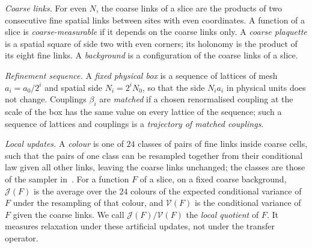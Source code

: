 \emph{Coarse links.} For even $N$, the coarse links of a slice are the products of two consecutive fine
spatial links between sites with even coordinates. A function of a slice is \emph{coarse-measurable} if it
depends on the coarse links only. A \emph{coarse plaquette} is a spatial square of side two with even corners;
its holonomy is the product of its eight fine links. A \emph{background} is a configuration of the coarse
links of a slice.

\emph{Refinement sequence.} A \emph{fixed physical box} is a sequence of lattices of mesh $a_i=a_0/2^i$ and
spatial side $N_i=2^iN_0$, so that the side $N_ia_i$ in physical units does not change. Couplings $\beta_i$ are
\emph{matched} if a chosen renormalised coupling at the scale of the box has the same value on every lattice
of the sequence; such a sequence of lattices and couplings is a \emph{trajectory of matched couplings}.

\emph{Local updates.} A \emph{colour} is one of $24$ classes of pairs of fine links inside coarse cells, such
that the pairs of one class can be resampled together from their conditional law given all other links,
leaving the coarse links unchanged; the classes are those of the sampler in~\cite{RepoData}. For a function
$F$ of a slice, on a fixed coarse background, $\mathcal J(F)$ is the average over the $24$ colours of the
expected conditional variance of $F$ under the resampling of that colour, and $\mathcal V(F)$ is the
conditional variance of $F$ given the coarse links. We call $\mathcal J(F)/\mathcal V(F)$ the \emph{local
quotient} of $F$. It measures relaxation under these artificial updates, not under the transfer operator.

